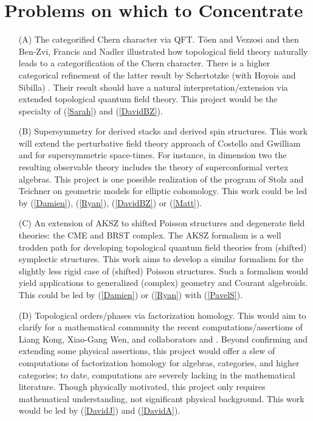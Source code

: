 \documentclass[11pt]{amsart}
\begin{document}
\section*{Problems on which to Concentrate}

\begin{itemize}
\item[(A)] The categorified Chern character via QFT.  T\"oen and Vezzosi \cite{TV1} and then Ben-Zvi, Francis and Nadler \cite{BFN} illustrated how topological field theory naturally leads to a categorification of the Chern character.  There is a higher categorical refinement of the latter result by Schertotzke (with Hoyois and Sibilla) \cite{HSS}.  Their result should have a natural interpretation/extension via extended topological quantum field theory. This project would be the specialty of (\ref{Sarah}) and (\ref{DavidBZ}).

\item[(B)] Supersymmetry for derived stacks and derived spin structures. 
This work will extend the perturbative field theory approach of Costello and Gwilliam \cite{CG1} and \cite{CG2}  for supersymmetric space-times. For instance, in dimension two the resulting observable theory includes the theory of superconformal vertex algebras. This project is one possible realization of the program of Stolz and Teichner on geometric models for elliptic cohomology.
This work could be led by (\ref{Damien}), (\ref{Ryan}), (\ref{DavidBZ}) or (\ref{Matt}).  

\item[(C)] An extension of AKSZ to shifted Poisson structures and degenerate field theories: the CME and BRST complex. The AKSZ formalism \cite{AKSZ} is a well trodden path for developing topological quantum field theories from (shifted) symplectic structures. This work aims to develop a similar formalism for the slightly less rigid case of (shifted) Poisson structures.
Such a formalism would yield applications to generalized (complex) geometry and Courant algebroids. 
This could be led by (\ref{Damien}) or (\ref{Ryan}) with (\ref{PavelS}).

\item[(D)] Topological orders/phases via factorization homology. 
This would aim to clarify for a mathematical community the recent computations/assertions of Liang Kong, Xiao-Gang Wen, and collaborators \cite{KW1} and \cite{KW2}. Beyond confirming and extending some physical assertions, this project would offer a slew of computations of factorization homology for algebras, categories, and higher categories; to date, computations are severely lacking in the mathematical literature. Though physically motivated, this project only requires mathematical understanding, not significant physical background. This work would be led by (\ref{DavidJ}) and  (\ref{DavidA}).

\end{itemize}
\end{document}
